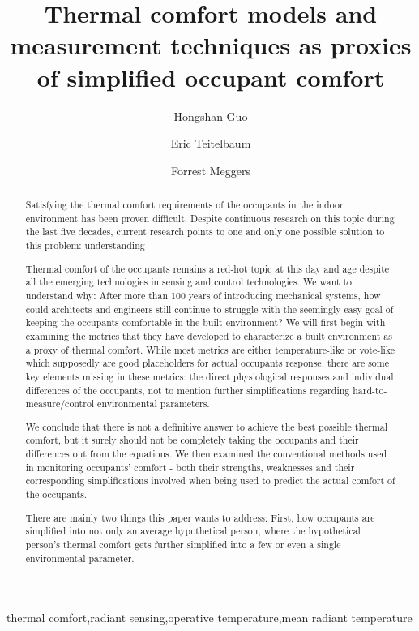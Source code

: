 \documentclass[review]{elsarticle}
\begin{document}
\begin{frontmatter}
\title{Thermal comfort models and measurement techniques as proxies of simplified occupant comfort}
\author[mymainaddress]{Hongshan Guo}
\author[mymainaddress]{Eric Teitelbaum}
\author[mymainaddress,mysecondaryaddress]{Forrest Meggers}
\address[mymainaddress]{School of Architecture, Princeton University, USA}
\address[mysecondaryaddress]{Andlinger Center for Energy and the Environment, Princeton University, USA.}
\begin{abstract}
Satisfying the thermal comfort requirements of the occupants in the indoor environment has been proven difficult. Despite continuous research on this topic during the last five decades, current research points to one and only one possible solution to this problem: understanding

Thermal comfort of the occupants remains a red-hot topic at this day and age despite all the emerging technologies in sensing and control technologies. We want to understand why: After more than 100 years of introducing mechanical systems, how could architects and engineers still continue to struggle with the seemingly easy goal of keeping the occupants comfortable in the built environment?
We will first begin with examining the metrics that they have developed to characterize a built environment as a proxy of thermal comfort.
While most metrics are either temperature-like or vote-like which supposedly are good placeholders for actual occupants response, there are some key elements missing in these metrics: the direct physiological responses and individual differences of the occupants, not to mention further simplifications regarding hard-to-measure/control environmental parameters.

We conclude that there is not a definitive answer to achieve the best possible thermal comfort, but it surely should not be completely taking the occupants and their differences out from the equations.
We then examined the conventional methods used in monitoring occupants' comfort - both their strengths, weaknesses and their corresponding simplifications involved when being used to predict the actual comfort of the occupants.

There are mainly two things this paper wants to address: First, how occupants are simplified into not only an average hypothetical person, where the hypothetical person's thermal comfort gets further simplified into a few or even a single environmental parameter.

\end{abstract}
\begin{keyword}thermal comfort\sep radiant sensing\sep operative temperature\sep mean radiant temperature\end{keyword}\end{frontmatter}
\tableofcontents
\end{document}
